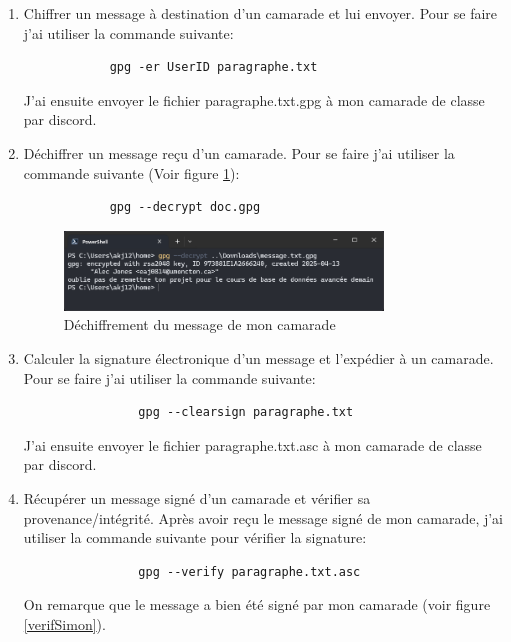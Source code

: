 \documentclass[12pt,a4paper]{article}
\begin{document}
\begin{enumerate}[label=\Roman*]
    \item Chiffrer un message à destination d'un camarade et lui envoyer.
          Pour se faire j'ai utiliser la commande suivante:
          \begin{verbatim}
            gpg -er UserID paragraphe.txt
          \end{verbatim}
          J'ai ensuite envoyer le fichier paragraphe.txt.gpg à mon camarade de classe par discord.

    \item Déchiffrer un message reçu d'un camarade.
          Pour se faire j'ai utiliser la commande suivante (Voir figure \ref{dechiffrer}):
          \begin{verbatim}
            gpg --decrypt doc.gpg
            \end{verbatim}

          \begin{figure}[ht]
              \centering
              \includegraphics[width=0.8\textwidth]{../img/dechiffrer.png}
              \caption{Déchiffrement du message de mon camarade}
              \label{dechiffrer}
          \end{figure}

    \item Calculer la signature électronique d'un message et l'expédier à un camarade.
          Pour se faire j'ai utiliser la commande suivante:
          \begin{verbatim}
                gpg --clearsign paragraphe.txt
            \end{verbatim}
          J'ai ensuite envoyer le fichier paragraphe.txt.asc à mon camarade de classe par discord.

    \item Récupérer un message signé d'un camarade et vérifier sa provenance/intégrité.
          Après avoir reçu le message signé de mon camarade, j'ai utiliser la commande suivante pour vérifier la signature:
          \begin{verbatim}
                gpg --verify paragraphe.txt.asc
            \end{verbatim}
          On remarque que le message a bien été signé par mon camarade (voir figure \ref{verifSimon}).


\end{enumerate}
\end{document}
